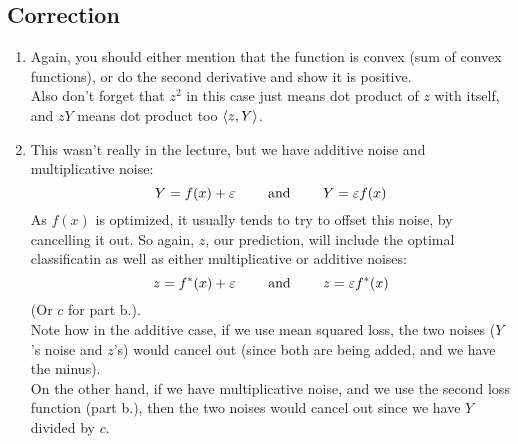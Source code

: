 \documentclass[12pt]{article}
\begin{document}
\subsection*{Correction}
\begin{enumerate}[label=\alph*)]
    \item
    Again, you should either mention that
    the function is convex
    (sum of convex functions),
    or do the second derivative and show it
    is positive. \\
    Also don't forget that $z^2$
    in this case just means dot product of $z$
    with itself,
    and $zY$ means dot product too $\left\langle z, Y \right\rangle$.
    \item
    This wasn't really in the lecture,
    but we have additive noise
    and multiplicative noise:
    \[ Y = f(x) + \varepsilon \qquad \text{ and } \qquad Y = \varepsilon f(x) \]
    As $f(x)$ is optimized,
    it usually tends to try to offset this noise,
    by cancelling it out.
    So again, $z$,
    our prediction, will include the optimal
    classificatin as well as either multiplicative
    or additive noises:
    \[ z = f^*(x) + \varepsilon
    \qquad \text{ and } \qquad z = \varepsilon f^*(x) \]
    (Or $c$ for part b.). \\
    Note how in the additive case,
    if we use mean squared loss, the two noises
    ($Y$'s noise and $z$'s)
    would cancel out (since both are being added,
    and we have the minus). \\
    On the other hand, if we have multiplicative
    noise, and we use the
    second loss function (part b.),
    then the two noises would cancel out 
    since we have $Y$ divided by $c$. \\

\end{enumerate}
\endgroup

\newpage
\end{document}

